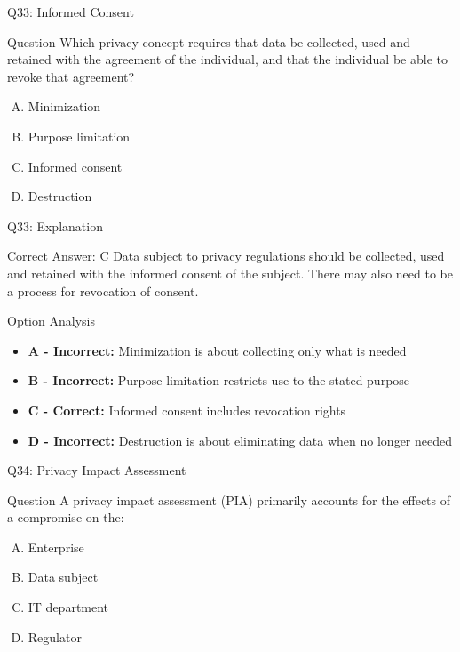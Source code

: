 \documentclass{beamer}
\begin{document}
	\begin{frame}{Q33: Informed Consent}
		\begin{block}{Question}
			Which privacy concept requires that data be collected, used and retained with the agreement of the individual, and that the individual be able to revoke that agreement?
		\end{block}
		\begin{enumerate}[(A)]
			\item Minimization
			\item Purpose limitation
			\item Informed consent
			\item Destruction
		\end{enumerate}
	\end{frame}
	
	\begin{frame}{Q33: Explanation}
		\begin{block}{Correct Answer: C}
			Data subject to privacy regulations should be collected, used and retained with the informed consent of the subject. There may also need to be a process for revocation of consent.
		\end{block}
		\begin{block}{Option Analysis}
			\begin{itemize}
				\item \textbf{A - Incorrect:} Minimization is about collecting only what is needed
				\item \textbf{B - Incorrect:} Purpose limitation restricts use to the stated purpose
				\item \textbf{C - Correct:} Informed consent includes revocation rights
				\item \textbf{D - Incorrect:} Destruction is about eliminating data when no longer needed
			\end{itemize}
		\end{block}
	\end{frame}
	
	\begin{frame}{Q34: Privacy Impact Assessment}
		\begin{block}{Question}
			A privacy impact assessment (PIA) primarily accounts for the effects of a compromise on the:
		\end{block}
		\begin{enumerate}[(A)]
			\item Enterprise
			\item Data subject
			\item IT department
			\item Regulator
		\end{enumerate}
	\end{frame}
	
\end{document}
